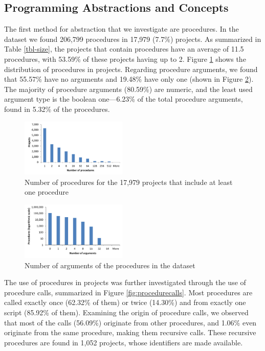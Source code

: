 \documentclass{sig-alternate-05-2015}
\begin{document}
\subsection{Programming Abstractions and Concepts}
\label{RQ2}
The first method for abstraction that we investigate are procedures. In the dataset we found 206,799 procedures in 17,979 (7.7\%) projects. As summarized in Table \ref{tbl-size}, the projects that contain procedures have an average of 11.5 procedures, with 53.59\% of these projects having up to 2. Figure \ref{fig:proceduresperproject} shows the distribution of procedures in projects. Regarding procedure arguments, we found that 55.57\% have no arguments and 19.48\% have only one (shown in Figure \ref{fig:procedurearguments}). The majority of procedure arguments (80.59\%) are numeric, and the least used argument type is the boolean one---6.23\% of the total procedure arguments, found in 5.32\% of the procedures.

\begin{figure}
	\centering
	\includegraphics[width=0.45\textwidth]{fig/charts/6proceduresperproject}
	\vspace{-1em}
	\caption{Number of procedures for the 17,979 projects that include at least one procedure}
	\label{fig:proceduresperproject}
\end{figure}

\begin{figure}
	\centering
	\includegraphics[width=0.45\textwidth]{fig/charts/5arguments}
	\vspace{-1em}
	\caption{Number of arguments of the procedures in the dataset}
	\label{fig:procedurearguments}
\end{figure}

The use of procedures in projects was further investigated through the use of procedure calls, summarized in Figure \ref{fig:procedurecalls}. Most procedures are called exactly once (62.32\% of them) or twice (14.30\%) and from exactly one script (85.92\% of them). Examining the origin of procedure calls, we observed that most of the calls (56.09\%) originate from other procedures, and 1.06\% even originate from the same procedure, making them recursive calls. These recursive procedures are found in 1,052 projects, whose identifiers are made available.\footnotemark[\ref{repo}]
\end{document}
